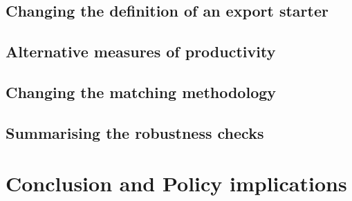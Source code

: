 \documentclass[11pt]{article}
\begin{document}
\subsection{Changing the definition of an export starter}




\subsection{Alternative measures of productivity}

\subsection{Changing the matching methodology}


\subsection{Summarising the robustness checks}


\section{Conclusion and Policy implications}\label{sec:conclusion}

\printbibliography
\newpage 

\newpage
\appendix





\end{document}
